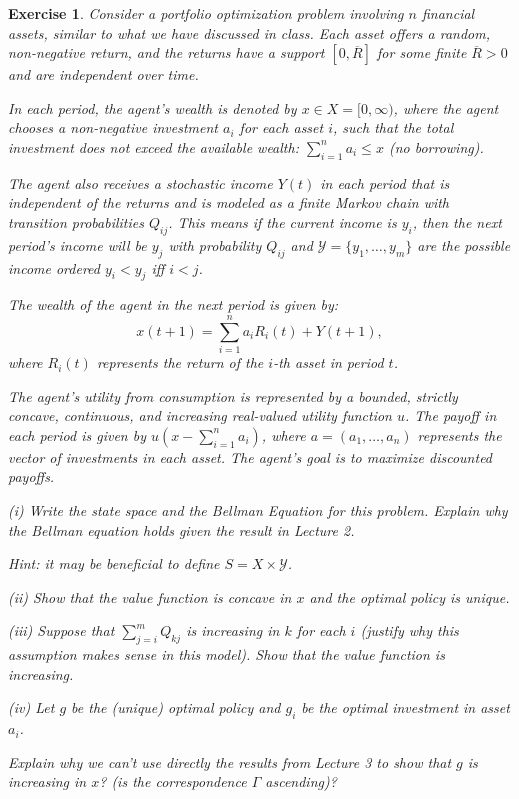 \documentclass[letter,11pt]{article}
\newtheorem{exercise}{Exercise}[section]
\begin{document}
\begin{exercise}
    Consider a portfolio optimization problem involving $n$ financial assets, similar to what we have discussed in class. Each asset offers a random, non-negative return, and the returns have a support $[0,\overline{R}]$ for some finite $\overline{R} > 0$ and are independent over time. 

    In each period, the agent's wealth is denoted by $x \in X = [0, \infty)$, where the agent chooses a non-negative investment $a_i$ for each asset $i$, such that the total investment does not exceed the available wealth: $\sum_{i=1}^n a_i \leq x$ (no borrowing).

    The agent also receives a stochastic income $Y(t)$ in each period that is independent of the returns and is modeled as a finite Markov chain with transition probabilities $Q_{ij}$. This means if the current income is $y_i$, then the next period's income will be $y_j$ with probability $Q_{ij}$ and $\mathcal{Y} = \{y_{1},\ldots,y_{m} \}$ are the possible income ordered $y_{i} < y_{j}$ iff $i<j$. 

    The wealth of the agent in the next period is given by:
    \[
    x(t+1) = \sum_{i=1}^n a_i R_i(t) + Y(t+1),
    \]
    where $R_i(t)$ represents the return of the $i$-th asset in period $t$.

    The agent's utility from consumption is represented by a bounded, strictly concave, continuous, and increasing real-valued utility function $u$. The payoff in each period is given by 
    $u(x - \sum_{i=1}^n a_i)$, 
    where $a = (a_1, \dots, a_n)$ represents the vector of investments in each asset. The agent's goal is to maximize discounted payoffs. 


   (i) Write the state space and the Bellman Equation for this problem. Explain why the Bellman equation holds given the result in Lecture 2. 

   Hint: it may be beneficial to define $S = X \times \mathcal{Y}$.

   (ii) Show that the value function is concave in $x$ and the optimal policy is unique. 
   
   (iii) Suppose that $\sum _{j=i}^{m} Q_{kj}$ is increasing in $k$ for each $i$ (justify why this assumption makes sense in this model). Show that the value function is increasing. 

   (iv)  Let $g$ be the (unique) optimal policy and $g_{i}$ be the optimal investment in asset $a_{i}$.
   
   Explain why we can't use directly the results from Lecture 3 to show that $g$ is increasing in $x$? (is the correspondence $\Gamma$ ascending)?
   

\end{exercise}
\end{document}
